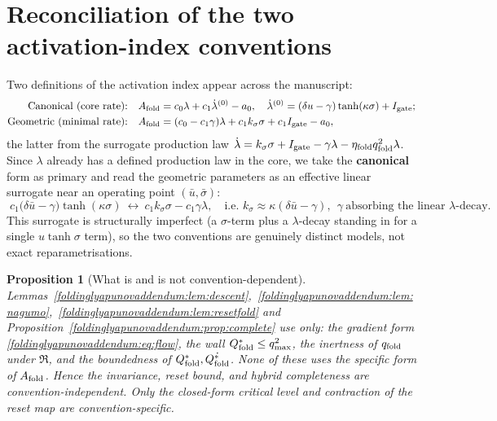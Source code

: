 \documentclass[11pt,a4paper,oneside]{book}
\newcommand{\Igate}{I_{\rm gate}}
\newcommand{\reset}{\mathfrak{R}}
\newcommand{\qf}{q_{\rm fold}}
\newcommand{\Qs}{Q_{\rm fold}^{*}}
\newcommand{\Af}{A_{\rm fold}}
\newcommand{\etaf}{\eta_{\rm fold}}
\theoremstyle{plain}
\newtheorem{proposition}{Proposition}[chapter]
\theoremstyle{definition}
\theoremstyle{remark}
\begin{document}
\section{Reconciliation of the two activation-index conventions}\label{foldinglyapunovaddendum:sec:conv}

Two definitions of the activation index appear across the manuscript:
\begin{align}
\text{Canonical (core rate):}\quad
&\Af=c_0\lambda+c_1\dot\lambda^{(0)}-a_0,\quad
\dot\lambda^{(0)}=(\delta u-\gamma)\tanh(\kappa\sigma)+\Igate;\\
\text{Geometric (minimal rate):}\quad
&\Af=(c_0-c_1\gamma)\lambda+c_1k_\sigma\sigma+c_1\Igate-a_0,
\end{align}
the latter from the surrogate production law $\dot\lambda=k_\sigma\sigma+\Igate-\gamma\lambda-\etaf\qf^2\lambda$.
Since $\lambda$ already has a defined production law in the core, we take the \textbf{canonical} form as
primary and read the geometric parameters as an effective linear surrogate near an operating point
$(\bar u,\bar\sigma)$:
\begin{equation}
\boxed{\;c_1\bigl(\delta\bar u-\gamma\bigr)\tanh(\kappa\sigma)\ \longleftrightarrow\
c_1k_\sigma\sigma-c_1\gamma\lambda,\quad\text{i.e. }
k_\sigma\approx\kappa(\delta\bar u-\gamma),\ \ \gamma\ \text{absorbing the linear }\lambda\text{-decay}.\;}
\end{equation}
This surrogate is structurally imperfect (a $\sigma$-term plus a $\lambda$-decay standing in for a single
$u\tanh\sigma$ term), so the two conventions are genuinely distinct models, not exact reparametrisations.

\begin{proposition}[What is and is not convention-dependent]\label{foldinglyapunovaddendum:prop:conv}
Lemmas~\ref{foldinglyapunovaddendum:lem:descent},~\ref{foldinglyapunovaddendum:lem:nagumo},~\ref{foldinglyapunovaddendum:lem:resetfold} and
Proposition~\ref{foldinglyapunovaddendum:prop:complete} use only: the gradient form \eqref{foldinglyapunovaddendum:eq:flow}, the wall $\Qs\le q_{\max}^2$,
the inertness of $\qf$ under $\reset$, and the boundedness of $\Qs,\dot{\Qs}$. None of these uses the
specific form of $\Af$. Hence the invariance, reset bound, and hybrid completeness are
\emph{convention-independent}. Only the closed-form critical level and contraction of the reset map are
convention-specific.
\end{proposition}
\end{document}
